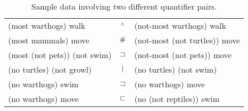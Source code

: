 

\begin{table}[htp]
  \centering
  \begin{tabular}{l c l}
    \toprule
    (most warthogs) walk         & $\mathbin{^{\wedge}}$ & (not-most warthogs) walk\\
    (most mammals) move          & $\mathbin{\#}$ &  (not-most (not turtles)) move\\
    (most (not pets)) (not swim) & $\sqsupset$ & (not-most (not pets)) move 
    \\[2ex]    
    (no turtles) (not growl)     & $\mathbin{|}$ & (no turtles) (not swim)\\
    (no warthogs) swim           & $\sqsupset$ & (no warthogs) move\\
    (no warthogs) move           & $\sqsubset$ & (no (not reptiles)) swim\\
    \bottomrule
  \end{tabular}
  \caption{Sample data involving two different quantifier pairs.}
  \label{examplesofdata}
\end{table}

